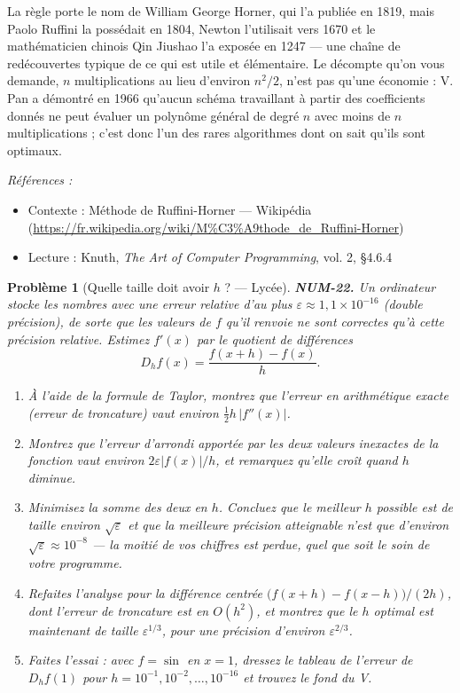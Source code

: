 \documentclass[11pt]{article}
\newtheorem{problem}{Problème}
\newenvironment{refs}{\par\small\noindent\emph{Références :}\begin{itemize}\setlength\itemsep{0pt}}{\end{itemize}\normalsize}
\begin{document}
\noindent La règle porte le nom de William George Horner, qui l'a publiée en 1819, mais Paolo Ruffini la possédait en 1804, Newton l'utilisait vers 1670 et le mathématicien chinois Qin Jiushao l'a exposée en 1247 --- une chaîne de redécouvertes typique de ce qui est utile et élémentaire. Le décompte qu'on vous demande, $n$ multiplications au lieu d'environ $n^2/2$, n'est pas qu'une économie : V. Pan a démontré en 1966 qu'aucun schéma travaillant à partir des coefficients donnés ne peut évaluer un polynôme général de degré $n$ avec moins de $n$ multiplications ; c'est donc l'un des rares algorithmes dont on sait qu'ils sont optimaux.

\begin{refs}
\item Contexte : Méthode de Ruffini-Horner --- Wikipédia (\url{https://fr.wikipedia.org/wiki/M%C3%A9thode_de_Ruffini-Horner})
\item Lecture : Knuth, \textit{The Art of Computer Programming}, vol. 2, \S{}4.6.4
\end{refs}

\bigskip

\begin{problem}[{Quelle taille doit avoir $h$ ? --- Lycée}]
\textbf{NUM-22.} Un ordinateur stocke les nombres avec une erreur relative d'au plus $\varepsilon \approx 1{,}1 \times 10^{-16}$ (double précision), de sorte que les valeurs de $f$ qu'il renvoie ne sont correctes qu'à cette précision relative. Estimez $f'(x)$ par le quotient de différences
\[ D_h f(x) = \frac{f(x+h) - f(x)}{h}. \]
\begin{enumerate}
\item[(a)] À l'aide de la formule de Taylor, montrez que l'erreur en arithmétique exacte (erreur de troncature) vaut environ $\tfrac{1}{2} h\,|f''(x)|$.
\item[(b)] Montrez que l'erreur d'arrondi apportée par les deux valeurs inexactes de la fonction vaut environ $2\varepsilon |f(x)| / h$, et remarquez qu'elle \textit{croît} quand $h$ diminue.
\item[(c)] Minimisez la somme des deux en $h$. Concluez que le meilleur $h$ possible est de taille environ $\sqrt{\varepsilon}$ et que la meilleure précision atteignable n'est que d'environ $\sqrt{\varepsilon} \approx 10^{-8}$ --- la moitié de vos chiffres est perdue, quel que soit le soin de votre programme.
\item[(d)] Refaites l'analyse pour la différence centrée $\big(f(x+h) - f(x-h)\big)/(2h)$, dont l'erreur de troncature est en $O(h^2)$, et montrez que le $h$ optimal est maintenant de taille $\varepsilon^{1/3}$, pour une précision d'environ $\varepsilon^{2/3}$.
\item[(e)] Faites l'essai : avec $f = \sin$ en $x = 1$, dressez le tableau de l'erreur de $D_h f(1)$ pour $h = 10^{-1}, 10^{-2}, \dots, 10^{-16}$ et trouvez le fond du V.
\end{enumerate}

\end{problem}
\end{document}
